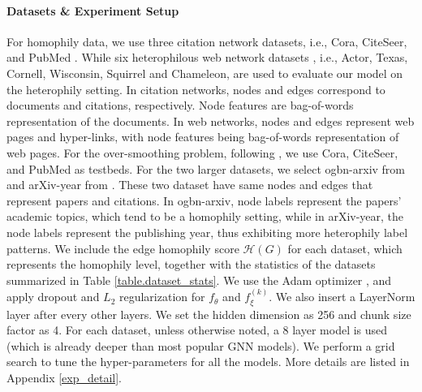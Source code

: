 \documentclass{article}
\begin{document}
\paragraph{Datasets \& Experiment Setup}
\label{exp_setup}
For homophily data, we use three citation network datasets, i.e., Cora, CiteSeer, and PubMed \citep{sen2008collective}. While six heterophilous web network datasets \citep{pei2020geom,musae}, i.e., Actor, Texas, Cornell, Wisconsin, Squirrel and Chameleon, are used to evaluate our model on the heterophily setting. In citation networks, nodes and edges correspond to documents and citations, respectively. Node features are bag-of-words representation of the documents. In web networks, nodes and edges represent web pages and hyper-links, with node features being bag-of-words representation of web pages. For the over-smoothing problem, following \citet{rong2019dropedge}, we use Cora, CiteSeer, and PubMed as testbeds. For the two larger datasets, we select ogbn-arxiv from \citet{hu2020open} and arXiv-year from \citet{lim2021new}. These two dataset have same nodes and edges that represent papers and citations. In ogbn-arxiv, node labels represent the papers' academic topics, which tend to be a homophily setting, while in arXiv-year, the node labels represent the publishing year, thus exhibiting more heterophily label patterns. We include the edge homophily score $\mathcal{H}(G)$ \citep{yan2021two} for each dataset, which represents the homophily level, together with the statistics of the datasets summarized in Table \ref{table.dataset_stats}.
We use the Adam optimizer \citep{kingma2014adam}, and apply dropout and $L_2$ regularization for $f_{\theta}$ and $f_{\xi}^{(k)}$. We also insert a LayerNorm \citep{ba2016layer} layer after every other layers. We set the hidden dimension as 256 and chunk size factor as 4. For each dataset, unless otherwise noted, a 8 layer model is used (which is already deeper than most popular GNN models).
We perform a grid search to tune the hyper-parameters for all the models.
More details are listed in Appendix \ref{exp_detail}.
\end{document}
